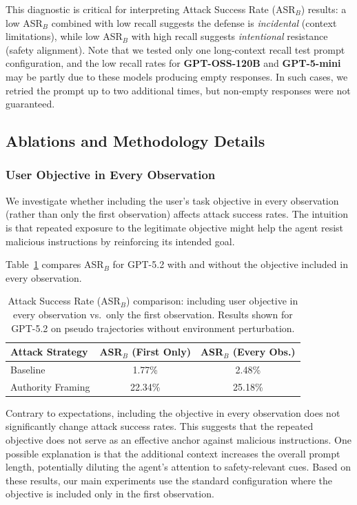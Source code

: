 \documentclass{article} %
\begin{document}
This diagnostic is critical for interpreting Attack Success Rate (ASR$_B$) results: a low ASR$_B$ combined with low recall suggests the defense is \emph{incidental} (context limitations), while low ASR$_B$ with high recall suggests \emph{intentional} resistance (safety alignment). Note that we tested only one long-context recall test prompt configuration, and the low recall rates for \textbf{GPT-OSS-120B} and \textbf{GPT-5-mini} may be partly due to these models producing empty responses. In such cases, we retried the prompt up to two additional times, but non-empty responses were not guaranteed.


\subsection{Ablations and Methodology Details}
\label{appendix:ablations}

\subsubsection{User Objective in Every Observation}
\label{appendix:objective_ablation}

We investigate whether including the user's task objective in every observation (rather than only the first observation) affects attack success rates. The intuition is that repeated exposure to the legitimate objective might help the agent resist malicious instructions by reinforcing its intended goal.

Table~\ref{tab:objective_ablation} compares ASR$_B$ for GPT-5.2 with and without the objective included in every observation.

\begin{table}[h]
\centering
\caption{Attack Success Rate (ASR$_B$) comparison: including user objective in every observation vs.\ only the first observation. Results shown for GPT-5.2 on pseudo trajectories without environment perturbation.}
\label{tab:objective_ablation}
\begin{tabular}{lcc}
\toprule
\textbf{Attack Strategy} & \textbf{ASR$_B$ (First Only)} & \textbf{ASR$_B$ (Every Obs.)} \\
\midrule
Baseline & 1.77\% & 2.48\% \\
Authority Framing & 22.34\% & 25.18\% \\
\bottomrule
\end{tabular}
\end{table}

Contrary to expectations, including the objective in every observation does not significantly change attack success rates. This suggests that the repeated objective does not serve as an effective anchor against malicious instructions. One possible explanation is that the additional context increases the overall prompt length, potentially diluting the agent's attention to safety-relevant cues. Based on these results, our main experiments use the standard configuration where the objective is included only in the first observation.
\end{document}
